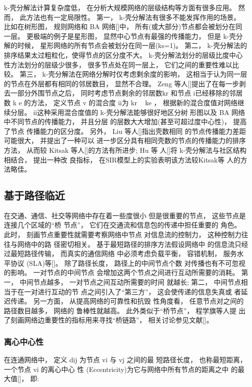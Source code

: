 				k-壳分解法计算复杂度低， 在分析大规模网络的层级结构等方面有很多应用。 然而， 此方法也有一定局限性。 第一， k-壳分解法有很多不能发挥作用的场景。 比如在树形图， 规则网络和 BA 网络[]中， 所有(或大部分)节点都会被划分在同一层。 更极端的例子是星形图， 显然中心节点有最强的传播能力， 但是 k-壳分解的时候， 星形网络的所有节点会被划分在同一层(ks=1)。 第二， k-壳分解法的排序结果太过粗粒化，使得节点的区分度不大。 k-壳分解法划分的层级比度中心性方法划分的层级少很多， 很多节点处在同一层上， 它们之间的重要性难以比较。 第三， k-壳分解法在网络分解时仅考虑剩余度的影响， 这相当于认为同一层的节点在外层都有相同的邻居数目， 显然不合理。 Zeng 等人[]提出了在每一步剥去一部分外围节点之后， 同时考虑节点剩余的邻居数kr 和节点 i已经移除的邻居数 k e 的方法， 定义节点 v 的混合度 ii为 kr ke ， 根据新的混合度值对网络继续分层。 ii这种采用混合度值的 k-壳分解法能够很好地区分树 形图以及 BA 网络中不同节点的传播能力， 并且分层 的层数大大增加(甚至可超过度中心性)， 提高了节点 传播能力的区分度。 另外， Liu 等人[]指出壳数相同 的节点传播能力差距可能很大， 并提出了一种可以 进一步区分具有相同壳数的节点的传播能力的排序方法， 从而较 Kitsak 等人[]的方法有所进步; Hu 等 人[]将 k-壳分解法与社区结构相结合， 提出一种改 良指标， 在SIR模型上的实验表明该方法较Kitsak等 人的方法略佳。
				
				
				
	\subsection{基于路径临近}
	在交通、通信、社交等网络中存在着一些度很小 但是很重要的节点， 这些节点是连接几个区域的“桥 节点”， 它们在交通流和信息包的传递中担任重要的 角色。 此时， 刻画节点重要性就需要考察网络中节点 对信息流的控制力， 这种控制力往往与网络中的路 径密切相关。 基于最短路径的排序方法假设网络中 的信息流只经过最短路径传输， 而真实的通信网络 中必须考虑负载平衡， 容错机制， 服务水平协议 (SLA)等[]。 除了路径长度， 路径上的中间节点个数 对传播也有不可忽视的影响。 一对节点的中间节点 会增加这两个节点之间进行互动所需要的消耗。 第 一， 中间节点越多， 一对节点之间互动所需要的时间 就越长; 第二， 中间节点相当于在一对进行互动的节 点之间引入了“第三方”， 这会使传递的信息失真或 者延迟传递。 另一方面， 从提高网络的可靠性和抗毁 性角度看， 任意节点对之间的路径数目越多， 网络的 鲁棒性就越高。 此外类似于“桥节点”， 程学旗等人提 出了刻画网络边重要性的指标用来寻找“桥链路”， 相关讨论参见文献[]。

	\subsubsection{离心中心性}
	在连通网络中， 定义 dij 为节点 vi 与 vj 之间的最 短路径长度， 也称最短距离， 一个节点 vi 的离心中心 性 (Eccentricity)为它与网络中所有节点的距离之中 的最大值[]， 即:

